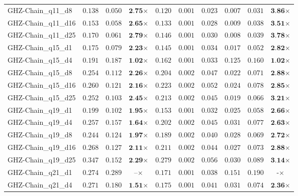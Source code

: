 \begin{table*}[t]
{\begin{tabular}{| l || r r c || r r r r r c |}
GHZ-Chain\_q11\_d8 & $0.138$ & $0.050$ & $\textbf{2.75}$$\times$ & $0.120$ & $0.001$ & $0.023$ & $0.007$ & $0.031$ & $\textbf{3.86}$$\times$ \\
GHZ-Chain\_q11\_d16 & $0.153$ & $0.058$ & $\textbf{2.65}$$\times$ & $0.133$ & $0.001$ & $0.028$ & $0.009$ & $0.038$ & $\textbf{3.51}$$\times$ \\
GHZ-Chain\_q11\_d25 & $0.170$ & $0.061$ & $\textbf{2.79}$$\times$ & $0.146$ & $0.001$ & $0.030$ & $0.008$ & $0.039$ & $\textbf{3.78}$$\times$ \\
GHZ-Chain\_q15\_d1 & $0.175$ & $0.079$ & $\textbf{2.23}$$\times$ & $0.145$ & $0.001$ & $0.034$ & $0.017$ & $0.052$ & $\textbf{2.82}$$\times$ \\
GHZ-Chain\_q15\_d4 & $0.191$ & $0.187$ & $\textbf{1.02}$$\times$ & $0.162$ & $0.001$ & $0.033$ & $0.125$ & $0.160$ & $\textbf{1.02}$$\times$ \\
GHZ-Chain\_q15\_d8 & $0.254$ & $0.112$ & $\textbf{2.26}$$\times$ & $0.204$ & $0.002$ & $0.047$ & $0.022$ & $0.071$ & $\textbf{2.88}$$\times$ \\
GHZ-Chain\_q15\_d16 & $0.260$ & $0.121$ & $\textbf{2.16}$$\times$ & $0.223$ & $0.002$ & $0.052$ & $0.024$ & $0.078$ & $\textbf{2.85}$$\times$ \\
GHZ-Chain\_q15\_d25 & $0.252$ & $0.103$ & $\textbf{2.45}$$\times$ & $0.213$ & $0.002$ & $0.045$ & $0.019$ & $0.066$ & $\textbf{3.21}$$\times$ \\
GHZ-Chain\_q19\_d1 & $0.199$ & $0.102$ & $\textbf{1.95}$$\times$ & $0.153$ & $0.001$ & $0.032$ & $0.025$ & $0.058$ & $\textbf{2.66}$$\times$ \\
GHZ-Chain\_q19\_d4 & $0.257$ & $0.157$ & $\textbf{1.64}$$\times$ & $0.202$ & $0.002$ & $0.045$ & $0.031$ & $0.077$ & $\textbf{2.63}$$\times$ \\
GHZ-Chain\_q19\_d8 & $0.244$ & $0.124$ & $\textbf{1.97}$$\times$ & $0.189$ & $0.002$ & $0.040$ & $0.028$ & $0.069$ & $\textbf{2.72}$$\times$ \\
GHZ-Chain\_q19\_d16 & $0.268$ & $0.127$ & $\textbf{2.11}$$\times$ & $0.211$ & $0.002$ & $0.044$ & $0.027$ & $0.073$ & $\textbf{2.88}$$\times$ \\
GHZ-Chain\_q19\_d25 & $0.347$ & $0.152$ & $\textbf{2.29}$$\times$ & $0.279$ & $0.002$ & $0.056$ & $0.030$ & $0.089$ & $\textbf{3.14}$$\times$ \\
GHZ-Chain\_q21\_d1 & $0.274$ & $0.289$ & $\textbf{--}$$\times$ & $0.171$ & $0.001$ & $0.038$ & $0.151$ & $0.190$ & $\textbf{-}$$\times$ \\
GHZ-Chain\_q21\_d4 & $0.271$ & $0.180$ & $\textbf{1.51}$$\times$ & $0.175$ & $0.001$ & $0.041$ & $0.031$ & $0.074$ & $\textbf{2.36}$$\times$ \\

\end{tabular}}
\end{table*}
